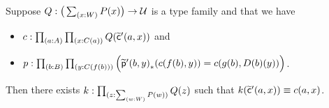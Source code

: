\documentclass[hott-all.tex]{subfiles}
\begin{document}
% 
% 
\begin{lem}
  Suppose $Q:\big(\sm{x:W} P(x)\big) \to \type$ is a type family and that we have
  \begin{itemize}
  \item $c : \prd{a:A}{x:C(a)} Q(\cct'(a,x))$ and
  \item $p : \prd{b:B}{y:C(f(b))} \Big(\trans{\ppt'(b,y)}{c(f(b),y)} = c(g(b),D(b)(y))\Big)$. %
  \end{itemize}
  Then there exists $k:\prd{z:\sm{w:W} P(w)} Q(z)$ such that $k(\widetilde{\mathsf{c}}'(a,x)) \equiv c(a,x)$.
\end{lem}
% 
\end{document}

